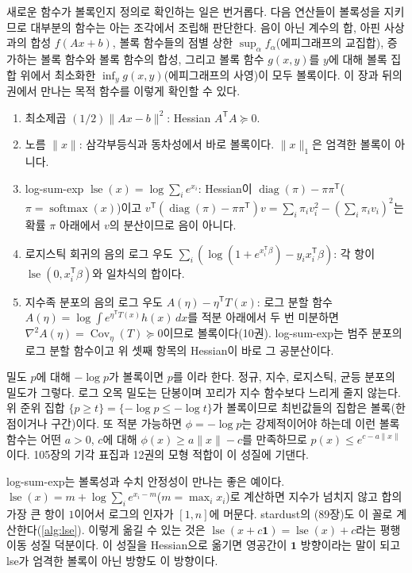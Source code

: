 새로운 함수가 볼록인지 정의로 확인하는 일은 번거롭다. 다음 연산들이 볼록성을 지키므로 대부분의 함수는 아는 조각에서 조립해 판단한다. 음이 아닌 계수의 합, 아핀 사상과의 합성 $f(Ax+b)$, 볼록 함수들의 점별 상한 $\sup_\alpha f_\alpha$(에피그래프의 교집합), 증가하는 볼록 함수와 볼록 함수의 합성, 그리고 볼록 함수 $g(x,y)$를 $y$에 대해 볼록 집합 위에서 최소화한 $\inf_yg(x,y)$(에피그래프의 사영)이 모두 볼록이다. 이 장과 뒤의 권에서 만나는 목적 함수를 이렇게 확인할 수 있다.
\begin{enumerate}
\item 최소제곱 $(1/2)\|Ax-b\|^2$: Hessian $A^{\mathsf T}A\succeq0$.
\item 노름 $\|x\|$: 삼각부등식과 동차성에서 바로 볼록이다. $\|x\|_1$은 엄격한 볼록이 아니다.
\item log-sum-exp $\operatorname{lse}(x)=\log\sum_ie^{x_i}$: Hessian이 $\operatorname{diag}(\pi)-\pi\pi^{\mathsf T}$($\pi=\operatorname{softmax}(x)$)이고 $v^{\mathsf T}(\operatorname{diag}(\pi)-\pi\pi^{\mathsf T})v=\sum_i\pi_iv_i^2-(\sum_i\pi_iv_i)^2$는 확률 $\pi$ 아래에서 $v$의 분산이므로 음이 아니다.
\item 로지스틱 회귀의 음의 로그 우도 $\sum_i(\log(1+e^{x_i^{\mathsf T}\beta})-y_ix_i^{\mathsf T}\beta)$: 각 항이 $\operatorname{lse}(0,x_i^{\mathsf T}\beta)$와 일차식의 합이다.
\item 지수족 분포의 음의 로그 우도 $A(\eta)-\eta^{\mathsf T}T(x)$: 로그 분할 함수 $A(\eta)=\log\int e^{\eta^{\mathsf T}T(x)}h(x)\,dx$를 적분 아래에서 두 번 미분하면 $\nabla^2A(\eta)=\operatorname{Cov}_\eta(T)\succeq0$이므로 볼록이다(10권). log-sum-exp는 범주 분포의 로그 분할 함수이고 위 셋째 항목의 Hessian이 바로 그 공분산이다.
\end{enumerate}
밀도 $p$에 대해 $-\log p$가 볼록이면 $p$를 이라 한다. 정규, 지수, 로지스틱, 균등 분포의 밀도가 그렇다. 로그 오목 밀도는 단봉이며 꼬리가 지수 함수보다 느리게 줄지 않는다. 위 준위 집합 $\{p\ge t\}=\{-\log p\le-\log t\}$가 볼록이므로 최빈값들의 집합은 볼록(한 점이거나 구간)이다. 또 적분 가능하면 $\phi=-\log p$는 강제적이어야 하는데 이런 볼록 함수는 어떤 $a>0$, $c$에 대해 $\phi(x)\ge a\|x\|-c$를 만족하므로 $p(x)\le e^{c-a\|x\|}$이다. 105장의 기각 표집과 12권의 모형 적합이 이 성질에 기댄다.

log-sum-exp는 볼록성과 수치 안정성이 만나는 좋은 예이다. $\operatorname{lse}(x)=m+\log\sum_ie^{x_i-m}$($m=\max_ix_i$)로 계산하면 지수가 넘치지 않고 합의 가장 큰 항이 $1$이어서 로그의 인자가 $[1,n]$에 머문다. stardust의 (89장)도 이 꼴로 계산한다(\cref{alg:lse}). 이렇게 옮길 수 있는 것은 $\operatorname{lse}(x+c\mathbf 1)=\operatorname{lse}(x)+c$라는 평행 이동 성질 덕분이다. 이 성질을 Hessian으로 옮기면 영공간이 $\mathbf 1$ 방향이라는 말이 되고 lse가 엄격한 볼록이 아닌 방향도 이 방향이다.

